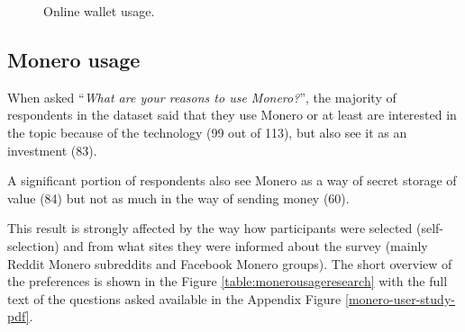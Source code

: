 \documentclass[
  printed, %
  table,   %
  lof,     %
  lot,     %
           oneside, color
]{fithesis3}
\begin{document}
\begin{center}
\begin{figure}[H]
\caption{Online wallet usage.}
\label{chart:price}\end{figure}\end{center}

\subsection{Monero usage}
When asked \enquote{\textit{What are your reasons to use Monero?}}, the majority of respondents in the dataset said that they use Monero or at least are interested in the topic because of the technology (99 out of 113), but also see it as an investment (83). 

A significant portion of respondents also see Monero as a way of secret storage of value (84) but not as much in the way of sending money (60).

This result is strongly affected by the way how participants were selected (self-selection) and from what sites they were informed about the survey (mainly Reddit Monero subreddits and Facebook Monero groups). The short overview of the preferences is shown in the Figure \ref{table:monerousageresearch} with the full text of the questions asked available in the Appendix Figure \ref{monero-user-study-pdf}.
\end{document}

